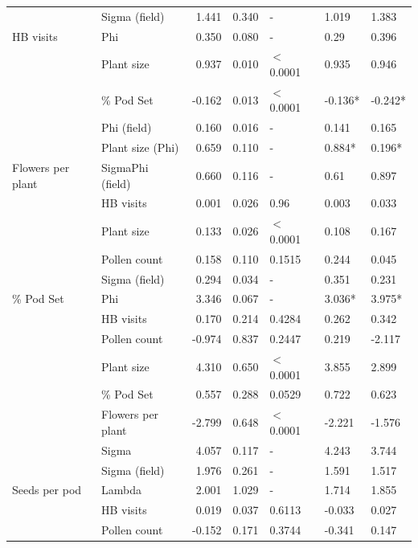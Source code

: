 \documentclass[12pt]{article} %
\begin{document}
\begin{longtable}{l|l|r|r|l|l|l}
\cline{2-7}
 & Sigma (field) & 1.441 & 0.340 & - & 1.019 & 1.383\\
\cline{2-7}
\multirow{-5}{*}{\raggedright\arraybackslash HB visits} & Phi & 0.350 & 0.080 & - & 0.29 & 0.396\\
\cline{1-7}
 & Plant size & 0.937 & 0.010 & $<$0.0001 & 0.935 & 0.946\\
\cline{2-7}
 & \% Pod Set & -0.162 & 0.013 & $<$0.0001 & -0.136* & -0.242*\\
\cline{2-7}
 & Phi (field) & 0.160 & 0.016 & - & 0.141 & 0.165\\
\cline{2-7}
 & Plant size (Phi) & 0.659 & 0.110 & - & 0.884* & 0.196*\\
\cline{2-7}
\multirow{-5}{*}{\raggedright\arraybackslash Flowers per plant} & SigmaPhi (field) & 0.660 & 0.116 & - & 0.61 & 0.897\\
\cline{1-7}
 & HB visits & 0.001 & 0.026 & 0.96 & 0.003 & 0.033\\
\cline{2-7}
 & Plant size & 0.133 & 0.026 & $<$0.0001 & 0.108 & 0.167\\
\cline{2-7}
 & Pollen count & 0.158 & 0.110 & 0.1515 & 0.244 & 0.045\\
\cline{2-7}
 & Sigma (field) & 0.294 & 0.034 & - & 0.351 & 0.231\\
\cline{2-7}
\multirow{-5}{*}{\raggedright\arraybackslash \% Pod Set} & Phi & 3.346 & 0.067 & - & 3.036* & 3.975*\\
\cline{1-7}
 & HB visits & 0.170 & 0.214 & 0.4284 & 0.262 & 0.342\\
\cline{2-7}
 & Pollen count & -0.974 & 0.837 & 0.2447 & 0.219 & -2.117\\
\cline{2-7}
 & Plant size & 4.310 & 0.650 & $<$0.0001 & 3.855 & 2.899\\
\cline{2-7}
 & \% Pod Set & 0.557 & 0.288 & 0.0529 & 0.722 & 0.623\\
\cline{2-7}
 & Flowers per plant & -2.799 & 0.648 & $<$0.0001 & -2.221 & -1.576\\
\cline{2-7}
 & Sigma & 4.057 & 0.117 & - & 4.243 & 3.744\\
\cline{2-7}
 & Sigma (field) & 1.976 & 0.261 & - & 1.591 & 1.517\\
\cline{2-7}
\multirow{-8}{*}{\raggedright\arraybackslash Seeds per pod} & Lambda & 2.001 & 1.029 & - & 1.714 & 1.855\\
\cline{1-7}
 & HB visits & 0.019 & 0.037 & 0.6113 & -0.033 & 0.027\\
\cline{2-7}
 & Pollen count & -0.152 & 0.171 & 0.3744 & -0.341 & 0.147\\

\end{longtable}
\end{document}
